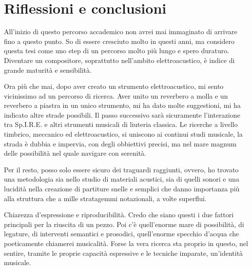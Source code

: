 
\chapter{Riflessioni e conclusioni}
\label{chp:Riflessioni e conclusioni}
All'inizio di questo percorso accademico non avrei mai immaginato di arrivare fino a questo punto. So di essere cresciuto molto in questi anni, ma considero questa tesi come uno step di un percorso molto più lungo e spero duraturo. Diventare un compositore, soprattutto nell'ambito elettroacustico, è indice di grande maturità e sensibilità.

Ora più che mai, dopo aver creato un strumento elettroacustico, mi sento vicinissimo ad un percorso di ricerca. Aver unito un reverbero a molla e un reverbero a piastra in un unico strumento, mi ha dato molte suggestioni, mi ha indicato altre strade possibili. Il passo successivo sarà sicuramente l'interazione tra Sp.I.R.E. e altri strumenti musicali di liuteria classica. Le ricerche a livello timbrico, meccanico ed elettroacustico, si uniscono ai continui studi musicale, la strada è dubbia e impervia, con degli obbiettivi precisi, ma nel mare magnum delle possibilità nel quale navigare con serenità.

Per il resto, posso solo essere sicuro dei traguardi raggiunti, ovvero, ho trovato una metodologia sia nello studio di materiali acustici, sia di quelli sonori e una lucidità nella creazione di partiture snelle e semplici che danno importanza più alla struttura che a mille stratagemmi notazionali, a volte superflui. 

Chiarezza d'espressione e riproducibilità. Credo che siano questi i due fattori principali per la riuscita di un pezzo. Poi c'è quell'enorme mare di possibilità, di legature, di interventi semantici e prosodici, quell'enorme specchio d'acqua che poeticamente chiamerei musicalità. Forse la vera ricerca sta proprio in questo, nel sentire, tramite le proprie capacità espressive e le tecniche imparate, un'identità musicale. \\